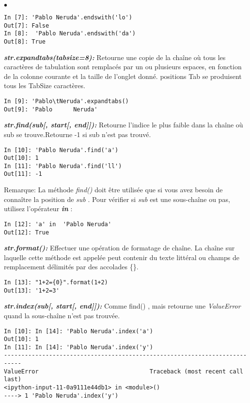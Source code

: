 \documentclass[10pt,dvipsnames,  dvips]{article}
\newlength\taille
\begin{document}
\begin{list}{$\bullet$}{}
\begin{lstlisting}
In [7]: 'Pablo Neruda'.endswith('lo')
Out[7]: False
In [8]:  'Pablo Neruda'.endswith('da')
Out[8]: True
\end{lstlisting}
\item \textit{\textbf{str.expandtabs(tabsize=8): }} Retourne une copie de la chaîne où tous les caractères de tabulation sont remplacés par un ou plusieurs espaces, en fonction de la colonne courante et la taille de l'onglet donné. positions Tab se produisent tous les TabSize caractères.
\begin{lstlisting}
In [9]: 'Pablo\tNeruda'.expandtabs()
Out[9]: 'Pablo      Neruda'
\end{lstlisting}
\item \textit{\textbf{ str.find(sub[, start[, end]]): }} Retourne l'indice le plus faible dans la chaîne où sub se trouve.Retourne -1 si sub n'est pas trouvé.
\begin{lstlisting}
In [10]: 'Pablo Neruda'.find('a')
Out[10]: 1
In [11]: 'Pablo Neruda'.find('ll')
Out[11]: -1
\end{lstlisting}

Remarque: La méthode \textit{find()} doit être utilisée que si vous avez besoin de connaître la position de \textit{sub} . Pour vérifier si \textit{sub} est une sous-chaîne ou pas, utilisez l'opérateur \textbf{\textit{in}} :
\begin{lstlisting}
In [12]: 'a' in  'Pablo Neruda'
Out[12]: True
\end{lstlisting}
\item \textit{\textbf{str.format(): }}Effectuer une opération de formatage de chaîne. La chaîne sur laquelle cette méthode est appelée peut contenir du texte littéral ou champs de remplacement délimités par des accolades \{\}.
\begin{lstlisting}
In [13]: "1+2={0}".format(1+2)
Out[13]: '1+2=3'
\end{lstlisting}
%
\item \textit{\textbf{str.index(sub[, start[, end]]): }} Comme find() , mais retourne une \textit{ValueError} quand la sous-chaîne n'est pas trouvée.
\begin{lstlisting}
In [10]: In [14]: 'Pablo Neruda'.index('a')
Out[10]: 1
In [11]: In [14]: 'Pablo Neruda'.index('y')
---------------------------------------------------------------------------
ValueError                                Traceback (most recent call last)
<ipython-input-11-0a9111e44db1> in <module>()
----> 1 'Pablo Neruda'.index('y')


\end{lstlisting}
\end{list}
\end{document}
